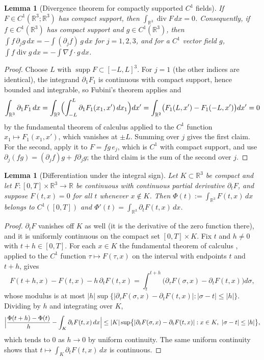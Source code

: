 \documentclass[11pt]{article}
\newtheorem{lemma}[theorem]{Lemma}
\theoremstyle{definition}
\theoremstyle{plain}
\newcommand{\R}{\mathbb R}
\begin{document}
\begin{lemma}[Divergence theorem for compactly supported $C^1$ fields]
\label{lem:divergence}
If $F\in C^1(\R^3;\R^3)$ has compact support, then
$\int_{\R^3}\operatorname{div}F\,dx=0$.  Consequently, if $f\in C^1(\R^3)$
has compact support and $g\in C^1(\R^3)$, then
$\int f\,\partial_jg\,dx=-\int(\partial_jf)\,g\,dx$ for $j=1,2,3$, and for a
$C^1$ vector field $g$, $\int f\operatorname{div}g\,dx=-\int\nabla f\cdot g\,dx$.
\end{lemma}

\begin{proof}
Choose $L$ with $\operatorname{supp}F\subset[-L,L]^3$.  For $j=1$ (the other
indices are identical), the integrand $\partial_1F_1$ is continuous with
compact support, hence bounded and integrable, so Fubini's theorem
\cite[Ch.~8]{Rudin1987} applies and
\[
 \int_{\R^3}\partial_1F_1\,dx
 =\int_{\R^2}\Bigl(\int_{-L}^{L}\partial_1F_1(x_1,x')\,dx_1\Bigr)dx'
 =\int_{\R^2}\bigl(F_1(L,x')-F_1(-L,x')\bigr)dx'=0
\]
by the fundamental theorem of calculus \cite[Ch.~7]{Rudin1987} applied to
the $C^1$ function $x_1\mapsto F_1(x_1,x')$, which vanishes at $\pm L$.
Summing over $j$ gives the first claim.  For the second, apply it to
$F=fg\,e_j$, which is $C^1$ with compact support, and use
$\partial_j(fg)=(\partial_jf)g+f\partial_jg$; the third claim is the sum of
the second over $j$.
\end{proof}

\begin{lemma}[Differentiation under the integral sign]
\label{lem:diff-under-integral}
Let $K\subset\R^3$ be compact and let $F:[0,T]\times\R^3\to\R$ be continuous
with continuous partial derivative $\partial_tF$, and suppose
$F(t,x)=0$ for all $t$ whenever $x\notin K$.  Then
$\Phi(t):=\int_{\R^3}F(t,x)\,dx$ belongs to $C^1([0,T])$ and
$\Phi'(t)=\int_{\R^3}\partial_tF(t,x)\,dx$.
\end{lemma}

\begin{proof}
$\partial_tF$ vanishes off $K$ as well (it is the derivative of the zero
function there), and it is uniformly continuous on the compact set
$[0,T]\times K$.  Fix $t$ and $h\neq0$ with $t+h\in[0,T]$.  For each $x\in K$
the fundamental theorem of calculus \cite[Ch.~7]{Rudin1987}, applied to the
$C^1$ function $\tau\mapsto F(\tau,x)$ on the interval with endpoints $t$
and $t+h$, gives
\[
 F(t+h,x)-F(t,x)-h\,\partial_tF(t,x)
 =\int_t^{t+h}\bigl(\partial_\tau F(\sigma,x)-\partial_tF(t,x)\bigr)d\sigma,
\]
whose modulus is at most
$|h|\sup\{|\partial_\tau F(\sigma,x)-\partial_tF(t,x)|:|\sigma-t|\leq|h|\}$.
Dividing by $h$ and integrating over $K$,
\[
 \Bigl|\frac{\Phi(t+h)-\Phi(t)}{h}-\int_K\partial_tF(t,x)\,dx\Bigr|
 \leq|K|\sup\bigl\{|\partial_tF(\sigma,x)-\partial_tF(t,x)|:
 x\in K,\ |\sigma-t|\leq|h|\bigr\},
\]
which tends to $0$ as $h\to0$ by uniform continuity.  The same uniform
continuity shows that $t\mapsto\int_K\partial_tF(t,x)\,dx$ is continuous.
\end{proof}
\end{document}
